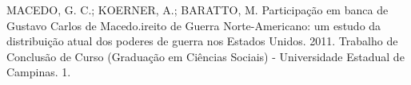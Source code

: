 

\begin{cvhonors}
  \cvhonor
    {MACEDO, G. C.; KOERNER, A.; BARATTO, M.}
    {Participação em banca de Gustavo Carlos de Macedo.ireito de Guerra Norte-Americano: um estudo da distribuição atual dos poderes de guerra nos Estados Unidos. 2011. Trabalho de Conclusão de Curso (Graduação em Ciências Sociais) - Universidade Estadual de Campinas.}
    {}
    {1. }
\end{cvhonors}
\pagebreak
